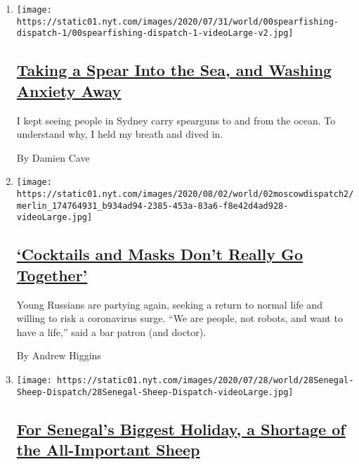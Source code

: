 \begin{enumerate}
\def\labelenumi{\arabic{enumi}.}
\item
  \texttt{[image: https://static01.nyt.com/images/2020/07/31/world/00spearfishing-dispatch-1/00spearfishing-dispatch-1-videoLarge-v2.jpg]}

  \hypertarget{taking-a-spear-into-the-sea-and-washing-anxiety-away}{%
  \subsection{\texorpdfstring{\href{/2020/08/03/world/australia/spearfishing-sydney-coronavirus.html}{Taking
  a Spear Into the Sea, and Washing Anxiety
  Away}}{Taking a Spear Into the Sea, and Washing Anxiety Away}}\label{taking-a-spear-into-the-sea-and-washing-anxiety-away}}

  I kept seeing people in Sydney carry spearguns to and from the ocean.
  To understand why, I held my breath and dived in.

  By Damien Cave
\item
  \texttt{[image: https://static01.nyt.com/images/2020/08/02/world/02moscowdispatch2/merlin\_174764931\_b934ad94-2385-453a-83a6-f8e42d4ad928-videoLarge.jpg]}

  \hypertarget{cocktails-and-masks-dont-really-go-together}{%
  \subsection{\texorpdfstring{\href{/2020/08/01/world/europe/russia-moscow-coronavirus.html}{`Cocktails
  and Masks Don't Really Go
  Together'}}{`Cocktails and Masks Don't Really Go Together'}}\label{cocktails-and-masks-dont-really-go-together}}

  Young Russians are partying again, seeking a return to normal life and
  willing to risk a coronavirus surge. ``We are people, not robots, and
  want to have a life,'' said a bar patron (and doctor).

  By Andrew Higgins
\item
  \texttt{[image: https://static01.nyt.com/images/2020/07/28/world/28Senegal-Sheep-Dispatch/28Senegal-Sheep-Dispatch-videoLarge.jpg]}

  \hypertarget{for-senegals-biggest-holiday-a-shortage-of-the-all-important-sheep}{%
  \subsection{\texorpdfstring{\href{/2020/07/29/world/africa/senegal-tabaski-sheep-eid-adha.html}{For
  Senegal's Biggest Holiday, a Shortage of the All-Important
  Sheep}}{For Senegal's Biggest Holiday, a Shortage of the All-Important Sheep}}\label{for-senegals-biggest-holiday-a-shortage-of-the-all-important-sheep}}


\end{enumerate}
